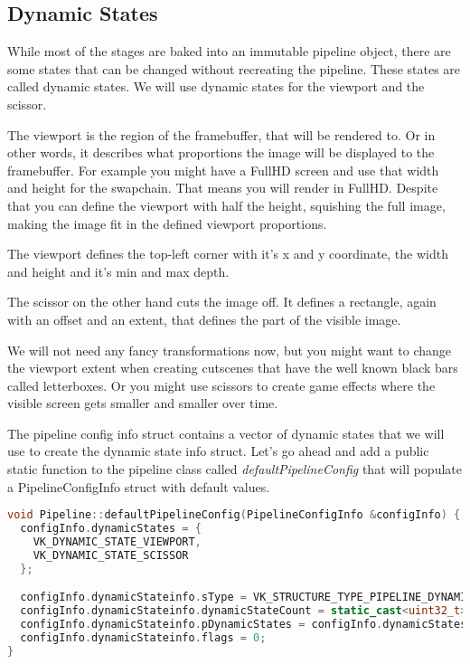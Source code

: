 \documentclass[12pt]{report} \usepackage{preamble}
\begin{document}
\subsection{Dynamic States}

While most of the stages are baked into an immutable pipeline object, there are some states that can be changed without
recreating the pipeline. These states are called dynamic states. We will use dynamic states for the viewport and the scissor.

The viewport is the region of the framebuffer, that will be rendered to. Or in other words, it describes what proportions the image
will be displayed to the framebuffer. For example you might have a FullHD screen and use that width and height for the swapchain.
That means you will render in FullHD. Despite that you can define the viewport with half the height, squishing the full image, making
the image fit in the defined viewport proportions.

The viewport defines the top-left corner with it's x and y coordinate,
the width and height and it's min and max depth.

The scissor on the other hand cuts the image off. It defines a rectangle, again with an offset and an extent, that
defines the part of the visible image.

We will not need any fancy transformations now, but you might want to change the viewport extent when creating cutscenes
that have the well known black bars called letterboxes. Or you might use scissors to create game effects where the visible
screen gets smaller and smaller over time.

The pipeline config info struct contains a vector of dynamic states that we will use to create the dynamic state info struct.
Let's go ahead and add a public static function to the pipeline class called \textit{defaultPipelineConfig} that will populate a
PipelineConfigInfo struct with default values.

\begin{lstlisting}[language=C++]
void Pipeline::defaultPipelineConfig(PipelineConfigInfo &configInfo) {
  configInfo.dynamicStates = {
    VK_DYNAMIC_STATE_VIEWPORT,
    VK_DYNAMIC_STATE_SCISSOR
  };

  configInfo.dynamicStateinfo.sType = VK_STRUCTURE_TYPE_PIPELINE_DYNAMIC_STATE_CREATE_INFO;
  configInfo.dynamicStateinfo.dynamicStateCount = static_cast<uint32_t>(configInfo.dynamicStates.size());
  configInfo.dynamicStateinfo.pDynamicStates = configInfo.dynamicStates.data();
  configInfo.dynamicStateinfo.flags = 0;
}
\end{lstlisting}
\end{document}
